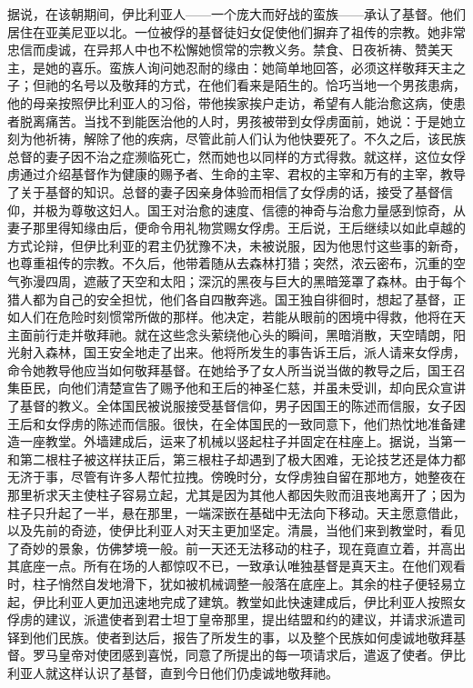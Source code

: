 据说，在该朝期间，伊比利亚人——一个庞大而好战的蛮族——承认了基督。他们居住在亚美尼亚以北。一位被俘的基督徒妇女促使他们摒弃了祖传的宗教。她非常忠信而虔诚，在异邦人中也不松懈她惯常的宗教义务。禁食、日夜祈祷、赞美天主，是她的喜乐。蛮族人询问她忍耐的缘由：她简单地回答，必须这样敬拜天主之子；但祂的名号以及敬拜的方式，在他们看来是陌生的。恰巧当地一个男孩患病，他的母亲按照伊比利亚人的习俗，带他挨家挨户走访，希望有人能治愈这病，使患者脱离痛苦。当找不到能医治他的人时，男孩被带到女俘虏面前，她说：于是她立刻为他祈祷，解除了他的疾病，尽管此前人们认为他快要死了。不久之后，该民族总督的妻子因不治之症濒临死亡，然而她也以同样的方式得救。就这样，这位女俘虏通过介绍基督作为健康的赐予者、生命的主宰、君权的主宰和万有的主宰，教导了关于基督的知识。总督的妻子因亲身体验而相信了女俘虏的话，接受了基督信仰，并极为尊敬这妇人。国王对治愈的速度、信德的神奇与治愈力量感到惊奇，从妻子那里得知缘由后，便命令用礼物赏赐女俘虏。王后说，王后继续以如此卓越的方式论辩，但伊比利亚的君主仍犹豫不决，未被说服，因为他思忖这些事的新奇，也尊重祖传的宗教。不久后，他带着随从去森林打猎；突然，浓云密布，沉重的空气弥漫四周，遮蔽了天空和太阳；深沉的黑夜与巨大的黑暗笼罩了森林。由于每个猎人都为自己的安全担忧，他们各自四散奔逃。国王独自徘徊时，想起了基督，正如人们在危险时刻惯常所做的那样。他决定，若能从眼前的困境中得救，他将在天主面前行走并敬拜祂。就在这些念头萦绕他心头的瞬间，黑暗消散，天空晴朗，阳光射入森林，国王安全地走了出来。他将所发生的事告诉王后，派人请来女俘虏，命令她教导他应当如何敬拜基督。在她给予了女人所当说当做的教导之后，国王召集臣民，向他们清楚宣告了赐予他和王后的神圣仁慈，并虽未受训，却向民众宣讲了基督的教义。全体国民被说服接受基督信仰，男子因国王的陈述而信服，女子因王后和女俘虏的陈述而信服。很快，在全体国民的一致同意下，他们热忱地准备建造一座教堂。外墙建成后，运来了机械以竖起柱子并固定在柱座上。据说，当第一和第二根柱子被这样扶正后，第三根柱子却遇到了极大困难，无论技艺还是体力都无济于事，尽管有许多人帮忙拉拽。傍晚时分，女俘虏独自留在那地方，她整夜在那里祈求天主使柱子容易立起，尤其是因为其他人都因失败而沮丧地离开了；因为柱子只升起了一半，悬在那里，一端深嵌在基础中无法向下移动。天主愿意借此，以及先前的奇迹，使伊比利亚人对天主更加坚定。清晨，当他们来到教堂时，看见了奇妙的景象，仿佛梦境一般。前一天还无法移动的柱子，现在竟直立着，并高出其底座一点。所有在场的人都惊叹不已，一致承认唯独基督是真天主。在他们观看时，柱子悄然自发地滑下，犹如被机械调整一般落在底座上。其余的柱子便轻易立起，伊比利亚人更加迅速地完成了建筑。教堂如此快速建成后，伊比利亚人按照女俘虏的建议，派遣使者到君士坦丁皇帝那里，提出结盟和约的建议，并请求派遣司铎到他们民族。使者到达后，报告了所发生的事，以及整个民族如何虔诚地敬拜基督。罗马皇帝对使团感到喜悦，同意了所提出的每一项请求后，遣返了使者。伊比利亚人就这样认识了基督，直到今日他们仍虔诚地敬拜祂。\par

